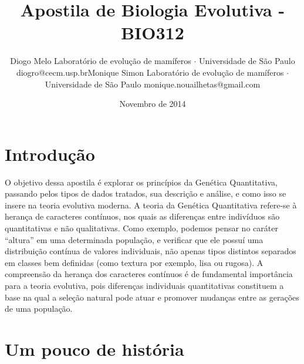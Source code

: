 \documentclass[portuges,]{tufte-handout}
\title{Apostila de Biologia Evolutiva - BIO312}
\author{\Large Diogo Melo\vspace{0.05in} \newline\normalsize Laboratório de evolução de mamíferos \(\cdot\) Universidade de São Paulo \newline\footnotesize diogro@cecm.usp.br\vspace*{0.2in}\newline \Large Monique Simon\vspace{0.05in} \newline\normalsize Laboratório de evolução de mamíferos \(\cdot\) Universidade de São Paulo \newline\footnotesize monique.nouailhetas@gmail.com\vspace*{0.2in}\newline }
\date{Novembro de 2014}
\begin{document}
\maketitle




\newpage

\section{Introdução}\label{introduuxe7uxe3o}

O objetivo dessa apostila é explorar os princípios da Genética
Quantitativa, passando pelos tipos de dados tratados, sua descrição e
análise, e como isso se insere na teoria evolutiva moderna. A teoria da
Genética Quantitativa refere-se à herança de caracteres contínuos, nos
quais as diferenças entre indivíduos são quantitativas e não
qualitativas. Como exemplo, podemos pensar no caráter ``altura'' em uma
determinada população, e verificar que ele possuí uma distribuição
contínua de valores individuais, não apenas tipos distintos separados em
classes bem definidas (como textura por exemplo, lisa ou rugosa). A
compreensão da herança dos caracteres contínuos é de fundamental
importância para a teoria evolutiva, pois diferenças individuais
quantitativas constituem a base na qual a seleção natural pode atuar e
promover mudanças entre as gerações de uma população.

\section{Um pouco de história}\label{um-pouco-de-histuxf3ria}
\end{document}
